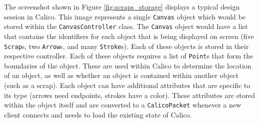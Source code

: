 The screenshot shown in Figure \ref{fig:scraps_storage} displays a typical design session in Calico. This image represents a single \texttt{Canvas} object which would be stored within the \texttt{CanvasController} class. The \texttt{Canvas} object would have a list that contains the identifiers for each object that is being displayed on screen (five \texttt{Scrap}s, two \texttt{Arrow}s, and many \texttt{Stroke}s). Each of these objects is stored in their respective controller. Each of these objects requires a list of \texttt{Point}s that form the boundaries of the object. These are used within Calico to determine the location of an object, as well as whether an object is contained within another object (such as a scrap). Each object can have additional attributes that are specific to its type (arrows need endpoints, strokes have a color). These attributes are stored within the object itself and are converted to a \texttt{CalicoPacket} whenever a new client connects and needs to load the existing state of Calico.



